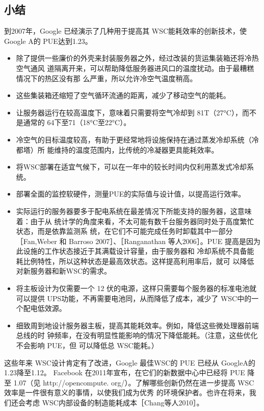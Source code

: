 \subsection{小结}
到2007年，Google 已经演示了几种用于提高其 WSC能耗效率的创新技术，使 Google A的
PUE达到1.23。
\begin{itemize}
    \item 除了提供一些廉价的外壳来封装服务器之外，经过改装的货运集装箱还将冷热空气通风
    道隔离开来，可以帮助降低服务器进风口的温度扰动。由于最糟糕情况下的热区没有那
    么严重，所以允许冷空气温度稍高。
    \item 这些集装箱还缩短了空气循环流通的距离，减少了移动空气的能耗。
    \item 让服务器运行在较高温度下，意味着只需要将空气冷却到 81T（27°C），而不是通常的
    64下至71（18°C至22°C）。
    \item 冷空气的目标温度较高，有助于更经常地将设施保持在通过蒸发冷却系统（冷都塔）所
    能维持的温度范围内，比传统的冷凝器更具能耗效率。
    \item 将WSC部署在适宜气候下，可以在一年中的较长时间内仅利用蒸发式冷却系统。
    \item 部署全面的监控软硬件，测量PUE的实际值与设计值，以提高运行效率。
    \item 实际运行的服务器要多于配电系统在最差情况下所能支持的服务器，这意味着：由于从
    统计学的角度来看，不太可能有数千台服务器同时处于高度繁忙状态，而是依靠监测系
    统，在它们不可能完成任务时卸载其中一部分［Fan,Weber 和 Barroso 2007］、［Ranganathan
    等人2006］。PUE 提高是因为此设施的工作状态接近于其满载设计容量，由于服务器和
    冷却系统不具备能耗比例特性，所以这种状态是最高效状态。这样提高利用率后，就可
    以降低对新服务器和新WSC的需求。
    \item 将主板设计为仅需要一个 12 伏的电源，这样只需要每个服务器的标准电池就可以提供
    UPS功能，不再需要电池同，从而降低了成本，减少了 WSC中的一个配电低效源。
    \item 细致周到地设计服务器主板，提高其能耗效率。例如，降低这些微处理器前端总线的时
    钟频率，在没有明显性能影响的情况下降低能耗。（注意，这些优化不会影响 PUE，但
    可以降低总 WSC能耗。）
\end{itemize}

这些年来 WSC设计肯定有了改进，Google 最佳WSC的 PUE 已经从 GoogleA的1.23降至1.12。
Facebook 在2011年宣布，在它们的新数据中心中已经将 PUE 降至 1.07（见 http://opencompute.
org/）。了解哪些创新仍然在进一步提高 WSC效率是一件很有意义的事情，以使我们成为优秀
的环境保护者。也许在将来，我们还会考虑 WSC内部设备的制造能耗成本［Chang等人2010］。

